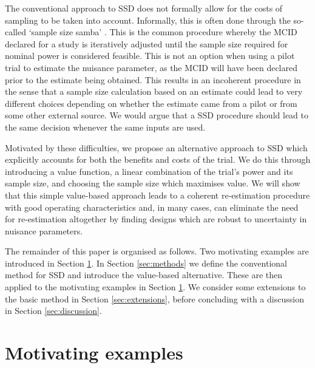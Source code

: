 \documentclass[sagev, Crown]{sagej}
\begin{document}
The conventional approach to SSD does not formally allow for the costs of sampling to be taken into account. Informally, this is often done through the so-called `sample size samba' \cite{Schulz2005}. This is the common procedure whereby the MCID declared for a study is iteratively adjusted until the sample size required for nominal power is considered feasible. This is not an option when using a pilot trial to estimate the nuisance parameter, as the MCID will have been declared prior to the estimate being obtained. This results in an incoherent procedure in the sense that a sample size calculation based on an estimate could lead to very different choices depending on whether the estimate came from a pilot or from some other external source. We would argue that a SSD procedure should lead to the same decision whenever the same inputs are used.

Motivated by these difficulties, we propose an alternative approach to SSD which explicitly accounts for both the benefits and costs of the trial. We do this through introducing a value function, a linear combination of the trial's power and its sample size, and choosing the sample size which maximises value. We will show that this simple value-based approach  leads to a coherent re-estimation procedure with good operating characteristics and, in many cases, can eliminate the need for re-estimation altogether by finding designs which are robust to uncertainty in nuisance parameters.

The remainder of this paper is organised as follows. Two motivating examples are introduced in Section \ref{sec:examples}. In Section \ref{sec:methods} we define the conventional method for SSD and introduce the value-based alternative. These are then applied to the motivating examples in Section \ref{sec:examples}. We consider some extensions to the basic method in Section \ref{sec:extensions}, before concluding with a discussion in Section \ref{sec:discussion}.

\section{Motivating examples}\label{sec:examples}


\end{document}

